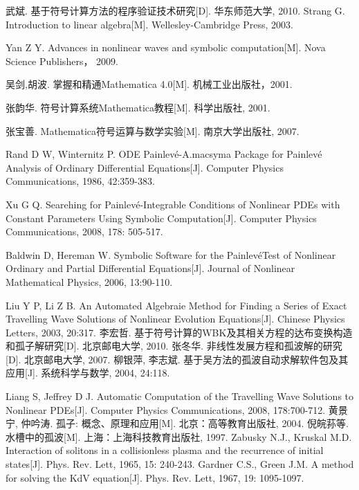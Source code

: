 \cleardoublepage
{}
{}
\nocite{*}
%

\begin{thebibliography}{0}

 武斌. 基于符号计算方法的程序验证技术研究[D]. 华东师范大学, 2010.
 Strang G. Introduction to linear algebra[M]. Wellesley-Cambridge Press, 2003.

 Yan Z Y. Advances in nonlinear waves and symbolic computation[M]. Nova Science
Publishers， 2009.

 吴剑,胡波. 掌握和精通Mathematica 4.0[M]. 机械工业出版社，2001.

 张韵华. 符号计算系统Mathematica教程[M]. 科学出版社, 2001.

 张宝善. Mathematica符号运算与数学实验[M]. 南京大学出版社, 2007.

 Rand D W, Winternitz P. ODE Painlev\'{e}-A.macsyma Package for Painlevé Analysis of Ordinary Differential Equations[J]. Computer Physics Communications, 1986, 42:359-383.

 Xu G Q. Searehing for Painlev\'{e}-Integrable Conditions of Nonlinear PDEs with Constant Parameters Using Symbolic Computation[J]. Computer Physics Communications, 2008, 178: 505-517.

 Baldwin D, Hereman W. Symbolic Software for the PainlevéTest of Nonlinear Ordinary and Partial Differential Equations[J]. Journal of Nonlinear Mathematical Physics, 2006, 13:90-110.

 Liu Y P, Li Z B. An Automated Algebraie Method for Finding a Series of Exact Travelling Wave Solutions of Nonlinear Evolution Equations[J]. Chinese Physics Letters, 2003, 20:317.
 李宏哲. 基于符号计算的WBK及其相关方程的达布变换构造和孤子解研究[D]. 北京邮电大学, 2010.
 张冬华. 非线性发展方程和孤波解的研究[D]. 北京邮电大学, 2007.
 柳银萍, 李志斌. 基于吴方法的孤波自动求解软件包及其应用[J]. 系统科学与数学, 2004, 24:118.

 Liang S, Jeffrey D J. Automatic Computation of the Travelling Wave Solutions to Nonlinear PDEs[J]. Computer Physics Communications, 2008, 178:700-712.
黄景宁, 仲吟涛. 孤子: 概念、原理和应用[M]. 北京：高等教育出版社, 2004.
倪皖荪等. 水槽中的孤波[M]. 上海：上海科技教育出版社, 1997.
Zabusky N.J., Kruskal M.D. Interaction of solitons in a collisionless plasma and the recurrence of initial states[J]. Phys. Rev. Lett, 1965, 15: 240-243.	
Gardner C.S., Green J.M. A method for solving the KdV equation[J]. Phys. Rev. Lett, 1967, 19: 1095-1097.


\end{thebibliography}
